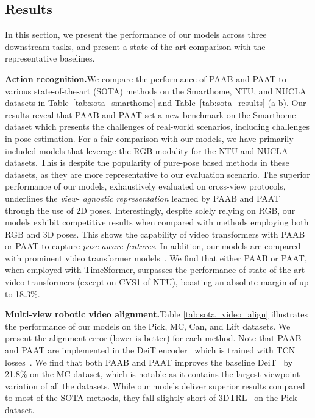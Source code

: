 \documentclass{article}
\begin{document}
\subsection{Results}
In this section, we present the performance of our models across three downstream tasks, and present a state-of-the-art comparison with the representative baselines. 


\textbf{Action recognition.}\quad We compare the performance of PAAB and PAAT to various state-of-the-art (SOTA) methods on the Smarthome, NTU, and NUCLA datasets in Table~\ref{tab:sota_smarthome} and Table~\ref{tab:sota_results} (a-b). 
Our results reveal that PAAB and PAAT set a new benchmark on the Smarthome dataset which presents the challenges of real-world scenarios, including challenges in pose estimation.  
For a fair comparison with our models, we have primarily included models that leverage the RGB modality for the NTU and NUCLA datasets. This is despite the popularity of pure-pose based methods in these datasets, as they are more representative to our evaluation scenario. The superior performance of our models, exhaustively evaluated on cross-view protocols, underlines the \textit{view- agnostic representation} learned by PAAB and PAAT through the use of 2D poses. 
Interestingly, despite solely relying on RGB, our models exhibit competitive results when compared with methods employing both RGB and 3D poses. This shows the capability of video transformers with PAAB or PAAT to capture \textit{pose-aware features}.
In addition, our models are compared with prominent video transformer models~\cite{liu2021videoswin, motionformerNeurIPS21, timesformer}. We find that either PAAB or PAAT, when employed with TimeSformer, surpasses the performance of state-of-the-art video transformers (except on CVS1 of NTU), boasting an absolute margin of up to 18.3\%.













\textbf{Multi-view robotic video alignment.}\quad Table \ref{tab:sota_video_align} illustrates the performance of our models on the Pick, MC, Can, and Lift datasets. We present the alignment error (lower is better) for each method. Note that PAAB and PAAT are implemented in the DeiT encoder~\cite{deit} which is trained with TCN losses~\cite{sermanet2018time}.
We find that both PAAB and PAAT improves the baseline DeiT~\cite{deit} by 21.8\%  on the MC dataset, which is notable as it contains the largest viewpoint variation of all the datasets.  
While our models deliver superior results compared to most of the SOTA methods, they fall slightly short of 3DTRL~\cite{3dtrl} on the Pick dataset.
\end{document}
